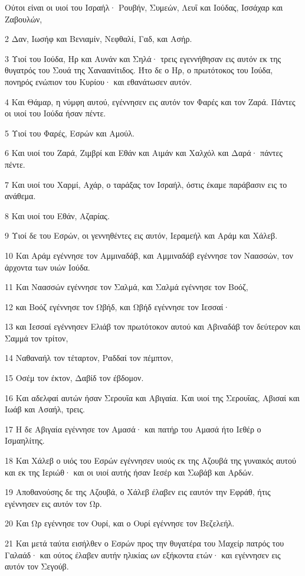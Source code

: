 \par Ούτοι είναι οι υιοί του Ισραήλ· Ρουβήν, Συμεών, Λευΐ και Ιούδας, Ισσάχαρ και Ζαβουλών,
\par 2 Δαν, Ιωσήφ και Βενιαμίν, Νεφθαλί, Γαδ, και Ασήρ.
\par 3 Υιοί του Ιούδα, Ηρ και Αυνάν και Σηλά· τρεις εγεννήθησαν εις αυτόν εκ της θυγατρός του Σουά της Χαναανίτιδος. Ήτο δε ο Ηρ, ο πρωτότοκος του Ιούδα, πονηρός ενώπιον του Κυρίου· και εθανάτωσεν αυτόν.
\par 4 Και Θάμαρ, η νύμφη αυτού, εγέννησεν εις αυτόν τον Φαρές και τον Ζαρά. Πάντες οι υιοί του Ιούδα ήσαν πέντε.
\par 5 Υιοί του Φαρές, Εσρών και Αμούλ.
\par 6 Και υιοί του Ζαρά, Ζιμβρί και Εθάν και Αιμάν και Χαλχόλ και Δαρά· πάντες πέντε.
\par 7 Και υιοί του Χαρμί, Αχάρ, ο ταράξας τον Ισραήλ, όστις έκαμε παράβασιν εις το ανάθεμα.
\par 8 Και υιοί του Εθάν, Αζαρίας.
\par 9 Υιοί δε του Εσρών, οι γεννηθέντες εις αυτόν, Ιεραμεήλ και Αράμ και Χάλεβ.
\par 10 Και Αράμ εγέννησε τον Αμμιναδάβ, και Αμμιναδάβ εγέννησε τον Ναασσών, τον άρχοντα των υιών Ιούδα.
\par 11 Και Ναασσών εγέννησε τον Σαλμά, και Σαλμά εγέννησε τον Βοόζ,
\par 12 και Βοόζ εγέννησε τον Ωβήδ, και Ωβήδ εγέννησε τον Ιεσσαί·
\par 13 και Ιεσσαί εγέννησεν Ελιάβ τον πρωτότοκον αυτού και Αβιναδάβ τον δεύτερον και Σαμμά τον τρίτον,
\par 14 Ναθαναήλ τον τέταρτον, Ραδδαί τον πέμπτον,
\par 15 Οσέμ τον έκτον, Δαβίδ τον έβδομον.
\par 16 Και αδελφαί αυτών ήσαν Σερουΐα και Αβιγαία. Και υιοί της Σερουΐας, Αβισαί και Ιωάβ και Ασαήλ, τρεις.
\par 17 Η δε Αβιγαία εγέννησε τον Αμασά· και πατήρ του Αμασά ήτο Ιεθέρ ο Ισμαηλίτης.
\par 18 Και Χάλεβ ο υιός του Εσρών εγέννησεν υιούς εκ της Αζουβά της γυναικός αυτού και εκ της Ιεριώθ· και οι υιοί αυτής ήσαν Ιεσέρ και Σωβάβ και Αρδών.
\par 19 Αποθανούσης δε της Αζουβά, ο Χάλεβ έλαβεν εις εαυτόν την Εφράθ, ήτις εγέννησεν εις αυτόν τον Ωρ.
\par 20 Και Ωρ εγέννησε τον Ουρί, και ο Ουρί εγέννησε τον Βεζελεήλ.
\par 21 Και μετά ταύτα εισήλθεν ο Εσρών προς την θυγατέρα του Μαχείρ πατρός του Γαλαάδ· και ούτος έλαβεν αυτήν ηλικίας ων εξήκοντα ετών· και εγέννησεν εις αυτόν τον Σεγούβ.
